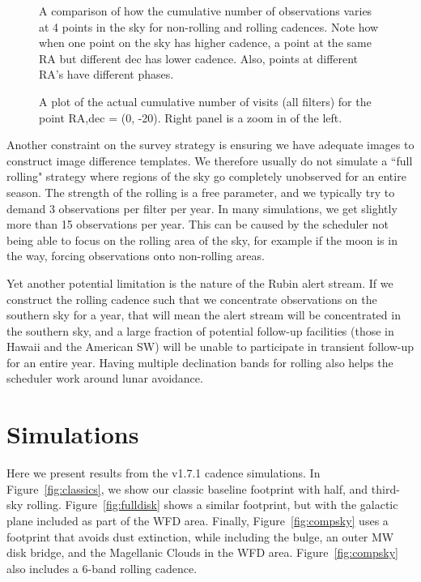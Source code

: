 \documentclass[modern]{aastex62}
\begin{document}
\begin{figure}
\caption{A comparison of how the cumulative number of observations varies at 4 points in the sky for non-rolling and rolling cadences. Note how when one point on the sky has higher cadence, a point at the same RA but different dec has lower cadence. Also, points at different RA's have different phases. \label{fig:ideal_foot}}
\end{figure}

\begin{figure}
\caption{A plot of the actual cumulative number of visits (all filters) for the point RA,dec = (0, -20). Right panel is a zoom in of the left. \label{fig:actual_foot}}
\end{figure}




Another constraint on the survey strategy is ensuring we have adequate images to construct image difference templates. We therefore usually do not simulate a ``full rolling" strategy where regions of the sky go completely unobserved for an entire season. The strength of the rolling is a free parameter, and we typically try to demand 3 observations per filter per year. In many simulations, we get slightly more than 15 observations per year. This can be caused by the scheduler not being able to focus on the rolling area of the sky, for example if the moon is in the way, forcing observations onto non-rolling areas.

Yet another potential limitation is the nature of the Rubin alert stream. If we construct the rolling cadence such that we concentrate observations on the southern sky for a year, that will mean the alert stream will be concentrated in the southern sky, and a large fraction of potential follow-up facilities (those in Hawaii and the American SW) will be unable to participate in transient follow-up for an entire year. Having multiple declination bands for rolling also helps the scheduler work around lunar avoidance.




\section{Simulations}

Here we present results from the v1.7.1 cadence simulations.  In Figure~\ref{fig:classics}, we show our classic baseline footprint with half, and third-sky rolling. Figure~\ref{fig:fulldisk} shows a similar footprint, but with the galactic plane included as part of the WFD area. Finally, Figure~\ref{fig:compsky} uses a footprint that avoids dust extinction, while including the bulge, an outer MW disk bridge, and the Magellanic Clouds in the WFD area. Figure~\ref{fig:compsky} also includes a 6-band rolling cadence. 
\end{document}
